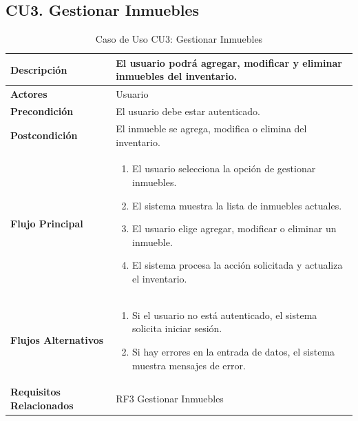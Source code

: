 \documentclass{article}
\begin{document}
\subsection{CU3. Gestionar Inmuebles}
\begin{table}[H]
    \centering
    \begin{tabular}{|l|p{10cm}|}
        \hline
        \textbf{Descripción} & El usuario podrá agregar, modificar y eliminar inmuebles del inventario. \\ \hline
        \textbf{Actores} & Usuario \\ \hline
        \textbf{Precondición} & El usuario debe estar autenticado. \\ \hline
        \textbf{Postcondición} & El inmueble se agrega, modifica o elimina del inventario. \\ \hline
        \textbf{Flujo Principal} & 
        \begin{enumerate}
            \item El usuario selecciona la opción de gestionar inmuebles.
            \item El sistema muestra la lista de inmuebles actuales.
            \item El usuario elige agregar, modificar o eliminar un inmueble.
            \item El sistema procesa la acción solicitada y actualiza el inventario.
        \end{enumerate} \\ \hline
        \textbf{Flujos Alternativos} & 
        \begin{enumerate}
            \item Si el usuario no está autenticado, el sistema solicita iniciar sesión.
            \item Si hay errores en la entrada de datos, el sistema muestra mensajes de error.
        \end{enumerate} \\ \hline
        \textbf{Requisitos Relacionados} & RF3 Gestionar Inmuebles \\ \hline
    \end{tabular}
    \caption{Caso de Uso CU3: Gestionar Inmuebles}
\end{table}
\end{document}
